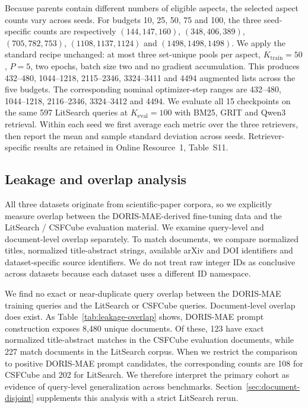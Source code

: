 \documentclass[pdflatex,sn-basic,Numbered]{sn-jnl}%
\theoremstyle{thmstyleone}%
\theoremstyle{thmstyletwo}%
\theoremstyle{thmstylethree}%
\begin{document}
Because parents contain different numbers of eligible aspects, the selected
aspect counts vary across seeds. For budgets 10, 25, 50, 75 and 100, the three
seed-specific counts are respectively $(144,147,160)$, $(348,406,389)$,
$(705,782,753)$, $(1108,1137,1124)$ and $(1498,1498,1498)$. We apply the
standard recipe unchanged: at most three set-unique pools per aspect,
$K_{\mathrm{train}}=50$, $P=5$, two epochs, batch size two and no gradient
accumulation. This produces 432--480, 1044--1218, 2115--2346, 3324--3411 and
4494 augmented lists across the five budgets. The corresponding nominal
optimizer-step ranges are 432--480, 1044--1218, 2116--2346, 3324--3412 and
4494. We evaluate all 15 checkpoints on the same 597 LitSearch queries at
$K_{\mathrm{eval}}=100$ with BM25, GRIT and Qwen3 retrieval. Within each seed
we first average each metric over the three retrievers, then report the mean and
sample standard deviation across seeds. Retriever-specific results are retained
in Online Resource~1, Table~S11.

\subsection{Leakage and overlap analysis}

All three datasets originate from scientific-paper corpora, so we explicitly
measure overlap between the DORIS-MAE-derived fine-tuning data and the
LitSearch / CSFCube evaluation material. We examine query-level and
document-level overlap separately. To match documents, we compare normalized
titles, normalized title-abstract strings, available arXiv and DOI identifiers and
dataset-specific source identifiers. We do not treat raw integer IDs as conclusive
across datasets because each dataset uses a different ID namespace.

We find no exact or near-duplicate query overlap between the DORIS-MAE training
queries and the LitSearch or CSFCube queries. Document-level overlap does exist.
As Table~\ref{tab:leakage-overlap} shows, DORIS-MAE prompt construction exposes
8,480 unique documents. Of these, 123 have exact normalized title-abstract
matches in the CSFCube evaluation documents, while 227 match documents in the
LitSearch corpus. When we restrict the comparison to positive DORIS-MAE prompt
candidates, the corresponding counts are 108 for CSFCube and 202 for LitSearch.
We therefore interpret the primary cohort as evidence of query-level
generalization across benchmarks. Section~\ref{sec:document-disjoint} supplements
this analysis with a strict LitSearch rerun.
\end{document}
